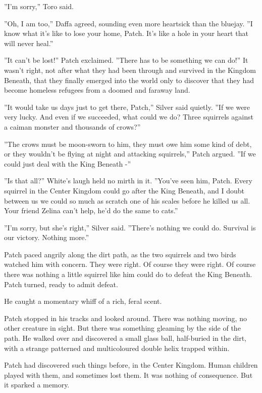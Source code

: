 \documentclass[12pt]{book}
\begin{document}
 ''I'm sorry,'' Toro said.\par
 ''Oh, I am too,'' Daffa agreed, sounding even more heartsick than the bluejay. ''I know what it's like to lose your home, Patch. It's like a hole in your heart that will never heal.''\par
 ''It can't be lost!'' Patch exclaimed. ''There has to be something we can do!'' It wasn't right, not after what they had been through and survived in the Kingdom Beneath, that they finally emerged into the world only to discover that they had become homeless refugees from a doomed and faraway land.\par
''It would take us days just to get there, Patch,'' Silver said quietly. ''If we were very lucky. And even if we succeeded, what could we do? Three squirrels against a caiman monster and thousands of crows?'' \par
 ''The crows must be moon-sworn to him, they must owe him some kind of debt, or they wouldn't be flying at night and attacking squirrels,'' Patch argued. ''If we could just deal with the King Beneath -''\par
 ''Is that all?'' White's laugh held no mirth in it. ''You've seen him, Patch. Every squirrel in the Center Kingdom could go after the King Beneath, and I doubt between us we could so much as scratch one of his scales before he killed us all. Your friend Zelina can't help, he'd do the same to cats.''\par
 ''I'm sorry, but she's right,'' Silver said. ''There's nothing we could do. Survival is our victory. Nothing more.''\par
 Patch paced angrily along the dirt path, as the two squirrels and two birds watched him with concern. They were right. Of course they were right. Of course there was nothing a little squirrel like him could do to defeat the King Beneath. Patch turned, ready to admit defeat.\par
He caught a momentary whiff of a rich, feral scent.\par
Patch stopped in his tracks and looked around. There was nothing moving, no other creature in sight. But there was something gleaming by the side of the path. He walked over and discovered a small glass ball, half-buried in the dirt, with a strange patterned and multicoloured double helix trapped within.\par
Patch had discovered such things before, in the Center Kingdom. Human children played with them, and sometimes lost them. It was nothing of consequence. But it sparked a memory.\par
\end{document}
